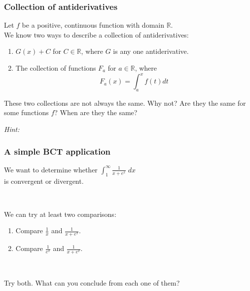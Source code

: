 \documentclass[14pt]{beamer}
\newcommand {\DS} [1] {${\displaystyle #1}$}
\newcommand {\R}{\mathbb{R}}
\newcommand{\p}{\pause}
\newcommand{\setsize}[1]{\fontsize{#1}{#1}\selectfont} %
\newcommand{\smallerfont}{\setsize{13}} %
\begin{document}
\begin{frame}[t]
\smallerfont
\frametitle{Collection of antiderivatives}

Let \DS{f} be a positive, continuous function with domain $\R$. \\
We know two ways to describe a collection of antiderivatives:
\begin{enumerate}
	\item  \DS{G(x) + C} for $C \in \R$, where $G$ is any one antiderivative.
	\item The collection of functions \DS{F_a} for \DS{a \in \R}, where
		$$
			F_a(x) = \int_a^x f(t) dt
		$$
\end{enumerate}

\p  These two collections are not always the same.  
Why not?  Are they the same for some functions $f$?  When are they the same?

\vspace{2.5cm} \hfill
\emph{Hint:}  \quad \href{https://tinyurl.com/137antiderivatives}{}
\end{frame}
\begin{frame}[t]
\smallerfont
\frametitle{A simple BCT application}

We want to determine whether \DS{\int_1^{\infty} \frac{1}{x+e^x} \; dx} \\ is convergent or divergent.  

\

We can try at least two comparisons:

	\begin{enumerate}
		\item  Compare \DS{\frac{1}{x}} and \DS{\frac{1}{x+ e^x}}.
		\item  Compare \DS{\frac{1}{e^x}} and \DS{\frac{1}{x+ e^x}}.
	\end{enumerate}

\

Try both.  What can you conclude from each one of them?
\end{frame}
\end{document}
